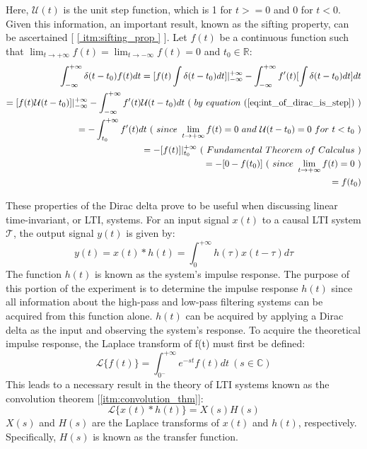 Here, $\mathcal{U}(t)$ is the unit step function, which is 1 for $t >= 0$ and 0 for $t < 0$. Given this information, an important result, known as the sifting property, can be ascertained [ \ref{ itm:sifting_prop } ]. Let $f(t)$ be a continuous function such that $\lim_{ t \to +\infty } f(t) = \lim_{ t \to -\infty } f(t) = 0$ and $t_0 \in \mathbb{R}$:
\begin{equation*}
	\label{eq:sifting_property}
	\begin{aligned}
	\int_{-\infty}^{+\infty} \delta( t - t_0 ) f(t) dt = [ f(t)\int \delta( t - t_0 ) dt ]\rvert_{-\infty}^{+\infty} - \int_{-\infty}^{+\infty} f'(t)[ \int \delta( t - t_0 ) dt ]dt \\
							   = [ f(t)\mathcal{U}( t - t_0 ) ]\rvert_{-\infty}^{+\infty} - \int_{-\infty}^{+\infty} f'(t)\mathcal{U}( t - t_0 )dt \ ( \ by \ equation \ (\ref{eq:int_of_dirac_is_step}) \ ) \\
							   = -\int_{t_0}^{+\infty} f'(t)dt \ ( \ since \ \lim_{ t \to +\infty } f(t) = 0 \ and \ \mathcal{U}( t - t_0 ) = 0 \ for \ t < t_0 \ ) \\
							   = -[ f(t) ]\rvert_{t_0}^{+\infty} \ ( \ Fundamental \ Theorem \ of \ Calculus \ ) \\
							   = -[ 0 - f(t_0) ] \ ( \ since \ \lim_{ t \to +\infty } f(t) = 0 \ ) \\
							   = f(t_0) \\
	\end{aligned}
\end{equation*}

These properties of the Dirac delta prove to be useful when discussing linear time-invariant, or LTI, systems. For an input signal $x(t)$ to a causal LTI system $\mathcal{T}$, the output signal $y(t)$ is given by:
\begin{equation}
	\label{eq:causal_lti_conv}
	y(t) = x(t) * h(t) = \int_{0}^{+\infty} h(\tau)x(t-\tau)d\tau
\end{equation}
The function $h(t)$ is known as the system's impulse response. The purpose of this portion of the experiment is to determine the impulse response $h(t)$ since all information about the high-pass and low-pass filtering systems can be acquired from this function alone. $h(t)$ can be acquired by applying a Dirac delta as the input and observing the system's response.
To acquire the theoretical impulse response, the Laplace transform of f(t) must first be defined:
\begin{equation}
	\label{eq:lt_def}
	\mathcal{L}\{f(t)\} = \int_{0^{-}}^{+\infty} e^{-st}f(t)dt \ ( s \in \mathbb{C} )
\end{equation}
This leads to a necessary result in the theory of LTI systems known as the convolution theorem [\ref{itm:convolution_thm}]:
\begin{equation}
	\label{eq:conv_thm}
	\mathcal{L}\{ x(t) * h(t) \} = X(s)H(s)
\end{equation}
$X(s)$ and $H(s)$ are the Laplace transforms of $x(t)$ and $h(t)$, respectively. Specifically, $H(s)$ is known as the transfer function.

